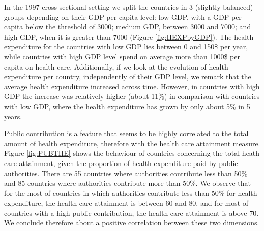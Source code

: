 \documentclass[12pt,a4paper]{article}\usepackage[]{graphicx}\usepackage[]{color}
\begin{document}

In the 1997 cross-sectional setting we split the countries in 3 (slightly balanced) groups depending on their GDP per capita level: low GDP, with a GDP per capita below the threshold of 3000; medium GDP, between 3000 and 7000; and high GDP, when it is greater than 7000 (Figure \ref{fig:HEXPbyGDP}).  
The health expenditure for the countries with low GDP lies between 0 and 150\$ per year, while countries with  high GDP level spend on average more than 1000\$ per capita on health care.  Additionally, if we look at the evolution of health expenditure per country, independently of their GDP level, we remark that the average health expenditure increased across time. However, in countries with high GDP the increase was relatively higher (about 11\%) in comparison with countries with low GDP, where the health expenditure has grown by only about 5\% in 5 years.



Public contribution is a feature that seems to be highly correlated to the total amount of health expenditure, therefore with the health care attainment measure. Figure \ref{fig:PUBTHE} shows the behaviour of countries concerning the total heath care attainment, given the proportion of health expenditure paid by public authorities.  There are 55 countries where authorities contribute less than 50\% and 85 countries where authorities contribute more than 50\%. We observe that for the most of countries in which authorities contribute less than 50\% for health expenditure, the health care attainment is between 60 and 80, and for most of countries with a high public contribution, the health care attainment is above 70. We conclude therefore about a positive correlation between these two dimensions.
\end{document}
